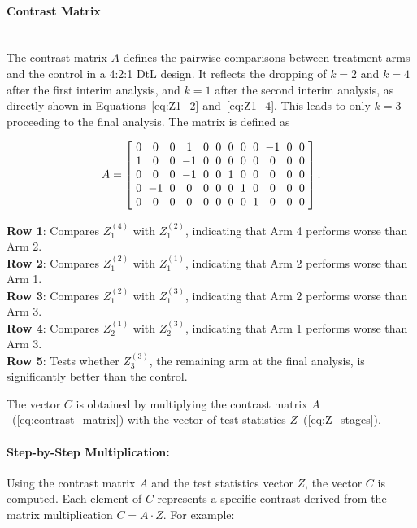 \documentclass[11pt, a4paper]{article}\usepackage[]{graphicx}\usepackage[]{xcolor}
\begin{document}
\paragraph{Contrast Matrix}\\

The contrast matrix \( A \) defines the pairwise comparisons between treatment arms and the control in a 4:2:1 DtL design. It reflects the dropping of \( k = 2 \) and \( k = 4 \) after the first interim analysis, and \( k = 1 \) after the second interim analysis, as directly shown in Equations~\ref{eq:Z1_2} and~\ref{eq:Z1_4}. This leads to only \( k = 3 \) proceeding to the final analysis. The matrix is defined as

\begin{equation}
\setlength{\arraycolsep}{3pt}
A =
\left[
\begin{array}{cccccccccccc}
0 & 0 & 0 & 1 & 0 & 0 & 0 & 0 & 0 & -1 & 0 & 0 \\
1 & 0 & 0 & -1 & 0 & 0 & 0 & 0 & 0 & 0 & 0 & 0 \\
0 & 0 & 0 & -1 & 0 & 0 & 1 & 0 & 0 & 0 & 0 & 0 \\
0 & -1 & 0 & 0 & 0 & 0 & 0 & 1 & 0 & 0 & 0 & 0 \\
0 & 0 & 0 & 0 & 0 & 0 & 0 & 0 & 1 & 0 & 0 & 0
\end{array}
\right]. \label{eq:contrast_matrix}
\end{equation}


\begin{flushleft}
\textbf{Row 1}: Compares \( Z_1^{(4)} \) with \( Z_1^{(2)} \), indicating that Arm 4 performs worse than Arm 2.\\
\textbf{Row 2}: Compares \( Z_1^{(2)} \) with \( Z_1^{(1)} \), indicating that Arm 2 performs worse than Arm 1.\\
\textbf{Row 3}: Compares \( Z_1^{(2)} \) with \( Z_1^{(3)} \), indicating that Arm 2 performs worse than Arm 3.\\
\textbf{Row 4}: Compares \( Z_2^{(1)} \) with \( Z_2^{(3)} \), indicating that Arm 1 performs worse than Arm 3.\\
\textbf{Row 5}: Tests whether \( Z_3^{(3)} \), the remaining arm at the final analysis, is significantly better than the control.
\end{flushleft}


The vector \( C \) is obtained by multiplying the contrast matrix \( A \)~(\ref{eq:contrast_matrix}) with the vector of test statistics \( Z \)~(\ref{eq:Z_stages}).


\paragraph{Step-by-Step Multiplication:}
Using the contrast matrix \( A \) and the test statistics vector \( Z \), the vector \( C \) is computed. Each element of \( C \) represents a specific contrast derived from the matrix multiplication \( C = A \cdot Z \). For example:
\end{document}
